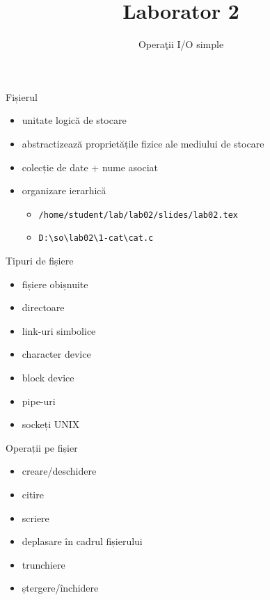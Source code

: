 \documentclass{so.cs.pub.ro}
\title[Laborator 2]{Laborator 2}
\subtitle{Operaţii I/O simple}
\begin{document}
\frame{\titlepage}

\begin{frame}{Fișierul}
  \begin{itemize}    %
    \item unitate logică de stocare
	  \vspace*{0.2cm}
    \item abstractizează proprietățile fizice ale mediului de stocare
	  \vspace*{0.2cm}
    \item colecție de date + nume asociat
	  \vspace*{0.2cm}
    \item organizare ierarhică
    \begin{itemize}
    	\item \texttt{/home/student/lab/lab02/slides/lab02.tex}
    	\item \texttt{D:\textbackslash so\textbackslash lab02\textbackslash 1-cat\textbackslash cat.c}
    \end{itemize}
	\end{itemize}
\end{frame}

\begin{frame}{Tipuri de fișiere}
	\begin{itemize}
	\item fișiere obișnuite
	\item directoare
	\item link-uri simbolice
	\item character device
	\item block device
	\item pipe-uri
	\item sockeți UNIX
	\end{itemize}
\end{frame}

\begin{frame}{Operații pe fișier}
	\begin{itemize}
	\item creare/deschidere
	\item citire
	\item scriere
	\item deplasare în cadrul fișierului
	\item trunchiere
	\item ștergere/închidere
	\end{itemize}
\end{frame}
\end{document}
